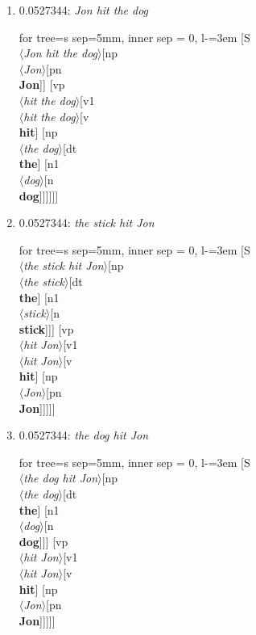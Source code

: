 \documentclass[11pt]{article}
\begin{document}
\begin{enumerate}
	\item  0.0527344: \textit{Jon hit the dog} \\[0.5em]
	\begin{forest}
	for tree={s sep=5mm, inner sep = 0, l-=3em}
	[S\\$\langle$\textit{Jon hit the dog}$\rangle$[np\\$\langle$\textit{Jon}$\rangle$[pn\\\textbf{Jon}]] [vp\\$\langle$\textit{hit the dog}$\rangle$[v1\\$\langle$\textit{hit the dog}$\rangle$[v\\\textbf{hit}] [np\\$\langle$\textit{the dog}$\rangle$[dt\\\textbf{the}] [n1\\$\langle$\textit{dog}$\rangle$[n\\\textbf{dog}]]]]]]
	\end{forest}
	\newpage

	\item  0.0527344: \textit{the stick hit Jon} \\[0.5em]
	\begin{forest}
	for tree={s sep=5mm, inner sep = 0, l-=3em}
	[S\\$\langle$\textit{the stick hit Jon}$\rangle$[np\\$\langle$\textit{the stick}$\rangle$[dt\\\textbf{the}] [n1\\$\langle$\textit{stick}$\rangle$[n\\\textbf{stick}]]] [vp\\$\langle$\textit{hit Jon}$\rangle$[v1\\$\langle$\textit{hit Jon}$\rangle$[v\\\textbf{hit}] [np\\$\langle$\textit{Jon}$\rangle$[pn\\\textbf{Jon}]]]]]
	\end{forest}
	\newpage

	\item  0.0527344: \textit{the dog hit Jon} \\[0.5em]
	\begin{forest}
	for tree={s sep=5mm, inner sep = 0, l-=3em}
	[S\\$\langle$\textit{the dog hit Jon}$\rangle$[np\\$\langle$\textit{the dog}$\rangle$[dt\\\textbf{the}] [n1\\$\langle$\textit{dog}$\rangle$[n\\\textbf{dog}]]] [vp\\$\langle$\textit{hit Jon}$\rangle$[v1\\$\langle$\textit{hit Jon}$\rangle$[v\\\textbf{hit}] [np\\$\langle$\textit{Jon}$\rangle$[pn\\\textbf{Jon}]]]]]
	\end{forest}
	\newpage


\end{enumerate}
\end{document}
